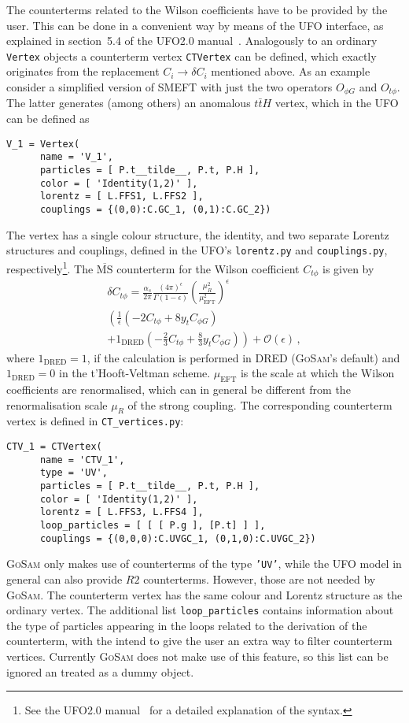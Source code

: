 \documentclass[11pt,a4paper]{refrep}
\newcommand{\gosam}{\textsc{GoSam}\xspace}
\begin{document}
The counterterms related to the Wilson coefficients have to be provided by the user. This can be done in a convenient way by means of the UFO interface, as explained in section~5.4 of the UFO2.0 manual~\cite{Darme:2023jdn}. Analogously to an ordinary \texttt{Vertex} objects a counterterm vertex \texttt{CTVertex} can be defined, which exactly originates from the replacement $C_i\to \delta C_i$ mentioned above. As an example consider a simplified version of SMEFT with just the two operators $O_{\phi G}$ and $O_{t\phi}$. The latter generates (among others) an anomalous $t\bar{t}H$ vertex, which in the UFO can be defined as
\begin{lstlisting}[gobble=3,style=py]
   V_1 = Vertex(
      name = 'V_1',
      particles = [ P.t__tilde__, P.t, P.H ],
      color = [ 'Identity(1,2)' ],
      lorentz = [ L.FFS1, L.FFS2 ],
      couplings = {(0,0):C.GC_1, (0,1):C.GC_2})
\end{lstlisting}
The vertex has a single colour structure, the identity, and two separate Lorentz structures and couplings, defined in the UFO's \texttt{lorentz.py} and \texttt{couplings.py}, respectively\footnote{See the UFO2.0 manual~\cite{Darme:2023jdn} for a detailed explanation of the syntax.}. The $\overline{\text{MS}}$ counterterm for the Wilson coefficient $C_{t\phi}$ is given by
\begin{multline}\label{eq:Ctphi_CT}
   \delta C_{t\phi} = \frac{\alpha_s}{2\pi}\frac{(4\pi)^\epsilon}{\Gamma(1-\epsilon)}\left(\frac{\mu_R^2}{\mu_\mathrm{EFT}^2}\right)^\epsilon\\\left(\frac{1}{\epsilon}\left(-2C_{t\phi}+8y_tC_{\phi G}\right)\right. \\+ \left.1_\mathrm{DRED}\left(-\frac{2}{3}C_{t\phi}+\frac{8}{3}y_tC_{\phi G}\right)\right) + \mathcal{O}(\epsilon)\,,
\end{multline}
where $1_\mathrm{DRED}=1$, if the calculation is performed in DRED (\gosam's default) and $1_\mathrm{DRED}=0$ in the t'Hooft-Veltman scheme. $\mu_\mathrm{EFT}$ is the scale at which the Wilson coefficients are renormalised, which can in general be different from the renormalisation scale $\mu_R$ of the strong coupling. The corresponding counterterm vertex is defined in \texttt{CT\_vertices.py}:
\begin{lstlisting}[gobble=3,style=py]
   CTV_1 = CTVertex(
      name = 'CTV_1',
      type = 'UV',
      particles = [ P.t__tilde__, P.t, P.H ],
      color = [ 'Identity(1,2)' ],
      lorentz = [ L.FFS3, L.FFS4 ],
      loop_particles = [ [ [ P.g ], [P.t] ] ],
      couplings = {(0,0,0):C.UVGC_1, (0,1,0):C.UVGC_2})
\end{lstlisting}
\gosam only makes use of counterterms of the type \texttt{'UV'}, while the UFO model in general can also provide $R2$ counterterms. However, those are not needed by \gosam. The counterterm vertex has the same colour and Lorentz structure as the ordinary vertex. The additional list \texttt{loop\_particles} contains information about the type of particles appearing in the loops related to the derivation of the counterterm, with the intend to give the user an extra way to filter counterterm vertices. Currently \gosam does not make use of this feature, so this list can be ignored an treated as a dummy object.
\end{document}
